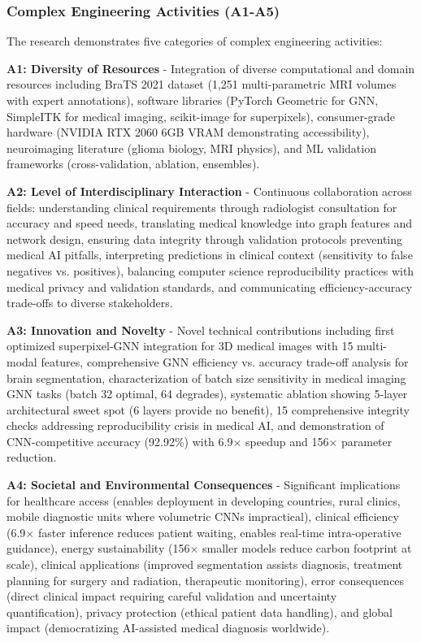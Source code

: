 \subsubsection{Complex Engineering Activities (A1-A5)}

The research demonstrates five categories of complex engineering activities:

\textbf{A1: Diversity of Resources} - Integration of diverse computational and domain resources including BraTS 2021 dataset (1,251 multi-parametric MRI volumes with expert annotations), software libraries (PyTorch Geometric for GNN, SimpleITK for medical imaging, scikit-image for superpixels), consumer-grade hardware (NVIDIA RTX 2060 6GB VRAM demonstrating accessibility), neuroimaging literature (glioma biology, MRI physics), and ML validation frameworks (cross-validation, ablation, ensembles).

\textbf{A2: Level of Interdisciplinary Interaction} - Continuous collaboration across fields: understanding clinical requirements through radiologist consultation for accuracy and speed needs, translating medical knowledge into graph features and network design, ensuring data integrity through validation protocols preventing medical AI pitfalls, interpreting predictions in clinical context (sensitivity to false negatives vs. positives), balancing computer science reproducibility practices with medical privacy and validation standards, and communicating efficiency-accuracy trade-offs to diverse stakeholders.

\textbf{A3: Innovation and Novelty} - Novel technical contributions including first optimized superpixel-GNN integration for 3D medical images with 15 multi-modal features, comprehensive GNN efficiency vs. accuracy trade-off analysis for brain segmentation, characterization of batch size sensitivity in medical imaging GNN tasks (batch 32 optimal, 64 degrades), systematic ablation showing 5-layer architectural sweet spot (6 layers provide no benefit), 15 comprehensive integrity checks addressing reproducibility crisis in medical AI, and demonstration of CNN-competitive accuracy (92.92\%) with 6.9$\times$ speedup and 156$\times$ parameter reduction.

\textbf{A4: Societal and Environmental Consequences} - Significant implications for healthcare access (enables deployment in developing countries, rural clinics, mobile diagnostic units where volumetric CNNs impractical), clinical efficiency (6.9$\times$ faster inference reduces patient waiting, enables real-time intra-operative guidance), energy sustainability (156$\times$ smaller models reduce carbon footprint at scale), clinical applications (improved segmentation assists diagnosis, treatment planning for surgery and radiation, therapeutic monitoring), error consequences (direct clinical impact requiring careful validation and uncertainty quantification), privacy protection (ethical patient data handling), and global impact (democratizing AI-assisted medical diagnosis worldwide).

